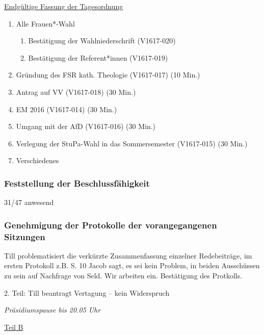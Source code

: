 \documentclass[ngerman,headheight=70pt]{scrartcl}
\begin{document}
    \underline{Endgültige Fassung der Tagesordnung}
    \begin{enumerate}[label={\textbf{Top \theenumi}},leftmargin=*]
        \item Alle Frauen*-Wahl
            \begin{enumerate}
                \item Bestätigung der Wahlniederschrift (V1617-020)
                \item Bestätigung der Referent*innen (V1617-019)
            \end{enumerate}
        \item Gründung des FSR kath. Theologie (V1617-017) (10 Min.)
        \item Antrag auf VV (V1617-018) (30 Min.)
        \item EM 2016 (V1617-014) (30 Min.)
        \item Umgang mit der AfD (V1617-016) (30 Min.)
        \item Verlegung der StuPa-Wahl in das Sommersemester (V1617-015) (30 Min.)
        \item Verschiedenes
    \end{enumerate}

    \subsubsection{Feststellung der Beschlussfähigkeit}

    31/47 anwesend

    \subsubsection{Genehmigung der Protokolle der vorangegangenen Sitzungen}

    Till problematisiert die verkürzte Zusammenfassung einzelner Redebeiträge,
    im ersten Protokoll z.B. S. 10 Jacob sagt, es sei kein Problem, in beiden
    Ausschüssen zu sein auf Nachfrage von Seld.
    Wir arbeiten ein. Bestätigung des Protkolls.

    2. Teil: Till beantragt Vertagung – kein Widerspruch

    \textit{Präsidiumspause bis 20.05 Uhr}

    \vspace{1cm}
    {\Large \underline{Teil B}}
\end{document}
